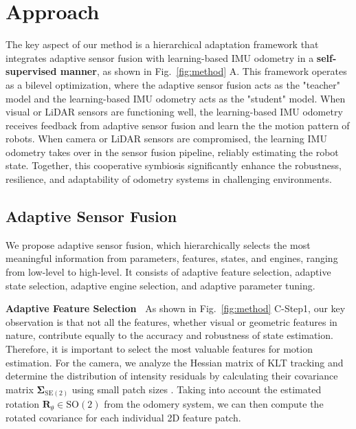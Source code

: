 \section{Approach}
The key aspect of our method is a hierarchical adaptation framework that integrates adaptive sensor fusion with learning-based IMU odometry in a \textbf{self-supervised manner}, as shown in Fig.~\ref{fig:method} A. This framework operates as a bilevel optimization\cite{wang2024imperative}, where the adaptive sensor fusion acts as the "teacher" model and the learning-based IMU odometry acts as the "student" model. 
When visual or LiDAR sensors are functioning well, the learning-based IMU odometry receives feedback from adaptive sensor fusion and learn the the motion pattern of robots. When camera or LiDAR sensors are compromised, the learning IMU odometry takes over in the sensor fusion pipeline, reliably estimating the robot state.
Together, this cooperative symbiosis significantly enhance the robustness, resilience, and adaptability of odometry systems in challenging environments.

\subsection{Adaptive Sensor Fusion} 
We propose adaptive sensor fusion, which hierarchically selects the most meaningful information from  parameters, features, states, and engines, ranging from low-level to high-level. It consists of adaptive feature selection, adaptive state selection, adaptive engine selection, and adaptive parameter tuning.


\textbf{Adaptive Feature Selection~}
 As shown in Fig.~\ref{fig:method} C-Step1, our key observation is that not all the features, whether visual or geometric features in nature, contribute equally to the accuracy and robustness of state estimation. Therefore, it is important to select the most valuable features for motion estimation. For the camera, we analyze the Hessian matrix of KLT tracking \cite{hwangbo2009inertial} and determine the distribution of intensity residuals by calculating their covariance matrix $\boldsymbol{\Sigma}_{\mathrm{SE(2)}}$ using small patch sizes \cite{muhle2022probabilistic}.
Taking into account the estimated rotation $\boldsymbol{R}_\theta \in \mathrm{SO}(2)$ from the odomery system, we can then compute the rotated covariance for each individual 2D feature patch.


